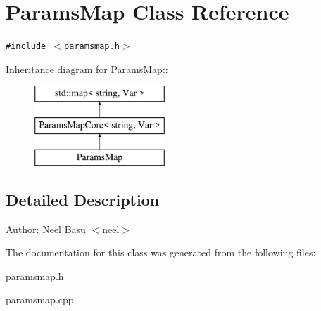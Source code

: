 \section{ParamsMap Class Reference}
\label{classParamsMap}
{\tt \#include $<$paramsmap.h$>$}

Inheritance diagram for ParamsMap::\begin{figure}[H]
\begin{center}
\leavevmode
\includegraphics[height=3cm]{classParamsMap}
\end{center}
\end{figure}


\subsection{Detailed Description}
\begin{Desc}
\item[Author:]Neel Basu $<$neel$>$ \end{Desc}


The documentation for this class was generated from the following files:\begin{CompactItemize}
\item 
paramsmap.h\item 
paramsmap.cpp\end{CompactItemize}
